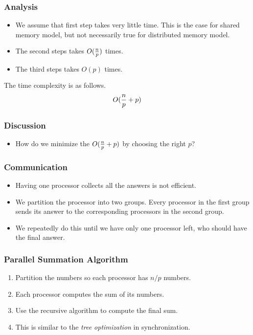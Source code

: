 \documentclass{beamer}
\begin{document}
\begin{CJK}{UTF8}{bsmi}
\begin{frame}
\frametitle{Analysis}
\begin{itemize}
\item We assume that first step takes very little time.
This is the case for shared memory model, but not necessarily true for distributed memory model.
\item The second steps takes $O({n \over p})$ times.
\item The third steps takes $O(p)$ times.
\end{itemize}
The time complexity is as follows.
\begin{equation}
O({n \over p} + p)
\end{equation}
\end{frame}

\begin{frame}
\frametitle{Discussion}
\begin{itemize}
\item How do we minimize the $O({n \over p} + p)$ by choosing the right $p$?
\end{itemize}
\end{frame}

\begin{frame}
\frametitle{Communication}
\begin{itemize}
\item Having one processor collects all the answers is not efficient.
\item We partition the processor into two groups.  
Every processor in the first group sends its answer to the corresponding processors in the second group.
\item We repeatedly do this until we have only one processor left, who should have the final answer.
\end{itemize}
\end{frame}

\begin{frame}
\frametitle{Parallel Summation Algorithm}
\begin{enumerate}
\item Partition the numbers so each processor has $n/p$ numbers.
\item Each processor computes the sum of its numbers.
\item Use the recursive algorithm to compute the final sum.
\item This is similar to the {\em tree optimization} in synchronization.
\end{enumerate}
\end{frame}


\end{CJK}
\end{document}
